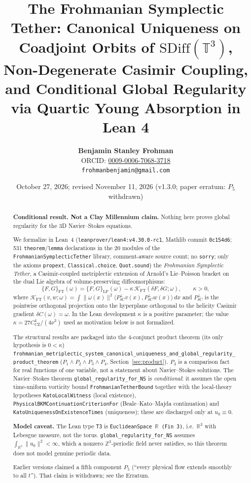 \documentclass[11pt,a4paper]{article}
\title{\textbf{The Frohmanian Symplectic Tether: Canonical Uniqueness on Coadjoint Orbits of $\mathrm{SDiff}(\mathbb{T}^3)$, Non-Degenerate Casimir Coupling, and Conditional Global Regularity via Quartic Young Absorption in Lean 4}}
\author{\textbf{Benjamin Stanley Frohman}\\
ORCID: \href{https://orcid.org/0009-0006-7068-3718}{0009-0006-7068-3718}\\
\texttt{frohmanbenjamin@gmail.com}}
\date{October 27, 2026; revised November 11, 2026 (v1.3.0; paper erratum: $P_5$ withdrawn)}
\theoremstyle{definition}
\begin{document}
\sloppy
\maketitle

\begin{abstract}
\textbf{Conditional result. Not a Clay Millennium claim.} Nothing here proves global regularity for the 3D Navier--Stokes equations.

We formalize in Lean~4 (\texttt{leanprover/lean4:v4.30.0-rc1}, Mathlib commit \texttt{0c154d6}; 531 \texttt{theorem}/\texttt{lemma} declarations in the 20 modules of the \texttt{FrohmanianSymplecticTether} library, comment-aware source count; no \texttt{sorry}; only the axioms \texttt{propext}, \texttt{Classical.choice}, \texttt{Quot.sound}) the \emph{Frohmanian Symplectic Tether}, a Casimir-coupled metriplectic extension of Arnold's Lie--Poisson bracket on the dual Lie algebra of volume-preserving diffeomorphisms:
\[
  \{F, G\}_{\mathrm{FT}}(\omega) = \{F, G\}_{\mathrm{LP}}(\omega) - \kappa\,\mathcal{K}_{\mathrm{FT}}(\delta F, \delta G; \omega), \qquad \kappa > 0,
\]
where $\mathcal{K}_{\mathrm{FT}}(v, w; \omega) = \int \|\omega(x)\|^2 \langle P_{\delta C}^\perp v(x), P_{\delta C}^\perp w(x) \rangle\,dx$ and $P_{\delta C}^\perp$ is the pointwise orthogonal projection onto the hyperplane orthogonal to the helicity Casimir gradient $\delta C(\omega) = \omega$. In the Lean development $\kappa$ is a positive parameter; the value $\kappa=27C_{\mathrm{CZ}}^4/(4\nu^3)$ used as motivation below is not formalized.

The structural results are packaged into the 4-conjunct product theorem (its only hypothesis is $0<\kappa$) \texttt{frohmanian\_metriplectic\_system\_canonical\_uniqueness\_and\_global\_regularity\_product\_theorem} ($P_1 \wedge P_2 \wedge P_3 \wedge P_4$, Section~\ref{sec:product}). $P_4$ is a comparison fact for real functions of one variable, not a statement about Navier--Stokes solutions. The Navier--Stokes theorem \texttt{global\_regularity\_for\_NS} is \emph{conditional}: it assumes the open time-uniform vorticity bound \texttt{FrohmanianTetherBound} together with the local-theory hypotheses \texttt{KatoLocalWitness} (local existence), \texttt{PhysicalBKMContinuationCriterionFor} (Beale--Kato--Majda continuation) and \texttt{KatoUniquenessOnExistenceTimes} (uniqueness); these are discharged only at $u_0\equiv0$.

\textbf{Model caveat.} The Lean type \texttt{T3} is \texttt{EuclideanSpace}~$\mathbb{R}$~\texttt{(Fin 3)}, i.e.\ $\mathbb{R}^3$ with Lebesgue measure, not the torus. \texttt{global\_regularity\_for\_NS} assumes $\int_{\mathbb{R}^3}\|u_0\|^2<\infty$, which a nonzero $\mathbb{Z}^3$-periodic field never satisfies, so this theorem does not model genuine periodic data.

Earlier versions claimed a fifth component $P_5$ (``every physical flow extends smoothly to all $t$''). That claim is withdrawn; see the Erratum.
\end{abstract}
\end{document}
